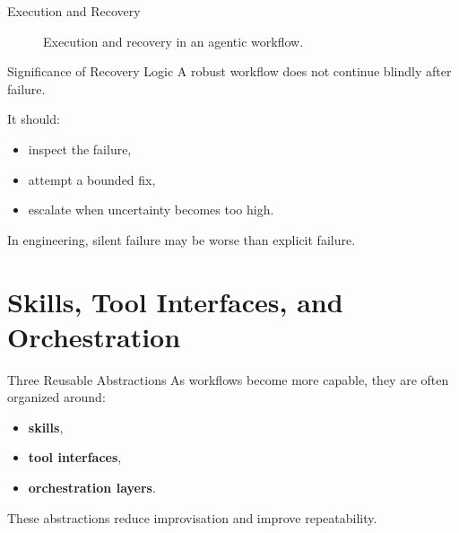 \documentclass[12pt]{beamer}
\begin{document}
\begin{frame}{Execution and Recovery}
  \begin{figure}
    \centering
    \caption{Execution and recovery in an agentic workflow.}
  \end{figure}
\end{frame}

\begin{frame}{Significance of Recovery Logic}
  A robust workflow does not continue blindly after failure.

  It should:
  \begin{itemize}
    \item inspect the failure,
    \item attempt a bounded fix,
    \item escalate when uncertainty becomes too high.
  \end{itemize}

  In engineering, silent failure may be worse than explicit failure.
\end{frame}

\section{Skills, Tool Interfaces, and Orchestration}

\begin{frame}{Three Reusable Abstractions}
  As workflows become more capable, they are often organized around:
  \begin{itemize}
    \item \textbf{skills},
    \item \textbf{tool interfaces},
    \item \textbf{orchestration layers}.
  \end{itemize}

  These abstractions reduce improvisation and improve repeatability.
\end{frame}
\end{document}
